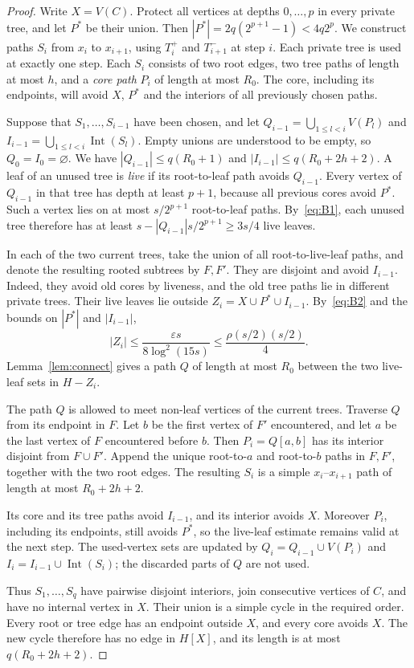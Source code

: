 \documentclass[10pt,letterpaper]{article}
\theoremstyle{definition}
\theoremstyle{remark}
\newcommand{\Int}{\operatorname{Int}}
\newcommand{\eps}{\varepsilon}
\begin{document}
\begin{proof}
Write $X=V(C)$. Protect all vertices at depths $0,\ldots,p$ in every private tree, and let $P^*$ be their union. Then $|P^*|=2q(2^{p+1}-1)<4q2^p$. We construct paths $S_i$ from $x_i$ to $x_{i+1}$, using $T_i^+$ and $T_{i+1}^-$ at step $i$. Each private tree is used at exactly one step. Each $S_i$ consists of two root edges, two tree paths of length at most $h$, and a \emph{core path} $P_i$ of length at most $R_0$. The core, including its endpoints, will avoid $X$, $P^*$ and the interiors of all previously chosen paths.

Suppose that $S_1,\ldots,S_{i-1}$ have been chosen, and let $Q_{i-1}=\bigcup_{1\le l<i}V(P_l)$ and $I_{i-1}=\bigcup_{1\le l<i}\Int(S_l)$. Empty unions are understood to be empty, so $Q_0=I_0=\varnothing$. We have $|Q_{i-1}|\le q(R_0+1)$ and $|I_{i-1}|\le q(R_0+2h+2)$. A leaf of an unused tree is \emph{live} if its root-to-leaf path avoids $Q_{i-1}$. Every vertex of $Q_{i-1}$ in that tree has depth at least $p+1$, because all previous cores avoid $P^*$. Such a vertex lies on at most $s/2^{p+1}$ root-to-leaf paths. By~\eqref{eq:B1}, each unused tree therefore has at least $s-|Q_{i-1}|s/2^{p+1}\ge3s/4$ live leaves.

In each of the two current trees, take the union of all root-to-live-leaf paths, and denote the resulting rooted subtrees by $F,F'$. They are disjoint and avoid $I_{i-1}$. Indeed, they avoid old cores by liveness, and the old tree paths lie in different private trees. Their live leaves lie outside $Z_i=X\cup P^*\cup I_{i-1}$. By~\eqref{eq:B2} and the bounds on $|P^*|$ and $|I_{i-1}|$,
\[
|Z_i|\le\frac{\eps s}{8\log^2(15s)}
\le\frac{\rho(s/2)(s/2)}4.
\]
Lemma~\ref{lem:connect} gives a path $Q$ of length at most $R_0$ between the two live-leaf sets in $H-Z_i$.

The path $Q$ is allowed to meet non-leaf vertices of the current trees. Traverse $Q$ from its endpoint in $F$. Let $b$ be the first vertex of $F'$ encountered, and let $a$ be the last vertex of $F$ encountered before $b$. Then $P_i=Q[a,b]$ has its interior disjoint from $F\cup F'$. Append the unique root-to-$a$ and root-to-$b$ paths in $F,F'$, together with the two root edges. The resulting $S_i$ is a simple $x_i$--$x_{i+1}$ path of length at most $R_0+2h+2$.

Its core and its tree paths avoid $I_{i-1}$, and its interior avoids $X$. Moreover $P_i$, including its endpoints, still avoids $P^*$, so the live-leaf estimate remains valid at the next step. The used-vertex sets are updated by $Q_i=Q_{i-1}\cup V(P_i)$ and $I_i=I_{i-1}\cup\Int(S_i)$; the discarded parts of $Q$ are not used.

Thus $S_1,\ldots,S_q$ have pairwise disjoint interiors, join consecutive vertices of $C$, and have no internal vertex in $X$. Their union is a simple cycle in the required order. Every root or tree edge has an endpoint outside $X$, and every core avoids $X$. The new cycle therefore has no edge in $H[X]$, and its length is at most $q(R_0+2h+2)$.
\end{proof}
\end{document}
